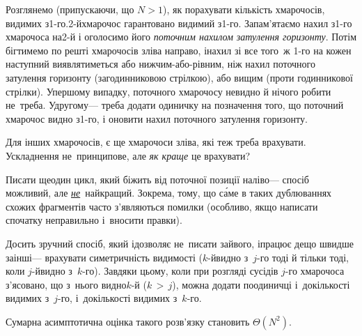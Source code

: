 Розглянемо (припускаючи, що $N{>}1$), як порахувати кількість хмарочосів, видимих з\nolinebreak[3] \mbox{1-го}.\linebreak[2] \mbox{2-й}\nolinebreak[3] хмарочос гарантовано видимий з\nolinebreak[3] \mbox{1-го}. Запам’ятаємо нахил з\nolinebreak[3] \mbox{1-го} хмарочоса на\nolinebreak[3] \mbox{2-й} і оголосимо його \emph{поточним нахилом затулення горизонту}. Потім бігтимемо по решті хмарочосів зліва направо, і\nolinebreak[3] нахил зі все того~ж \mbox{1-го} на кожен наступний виявлятиметься або нижчим-або-рівним, ніж нахил поточного затулення горизонту (за\nolinebreak[3] годинниковою стрілкою), або вищим (проти годинникової стрілки). У\nolinebreak[3] першому випадку, поточного хмарочосу не\nolinebreak[3] видно й нічого робити не~треба. У\nolinebreak[3] другому\nolinebreak[3] --- треба додати одиничку на позначення того, що поточний хмарочос видно з\nolinebreak[3] \mbox{1-го}, і оновити нахил поточного затулення горизонту.

Для інших хмарочосів, є ще хмарочоси зліва, які теж треба врахувати. Ускладнення не~принципове, але \emph{як краще} це врахувати?
\ifAfour\else\par\fi
Писати ще\nolinebreak[3] один цикл, який біжить від поточної позиції наліво\nolinebreak[3] --- спосіб можливий, але \underline{\emph{не}}~найкращий. Зокрема, тому, що с\'{а}ме в таких дублюваннях схожих фрагментів часто з'являються помилки (особливо, якщо написати спочатку неправильно і~вносити правки).

Досить зручний спосіб, який і\nolinebreak[3] дозволяє не~писати зайвого, і\nolinebreak[3] працює дещо швидше за\nolinebreak[2] інші\nolinebreak[3] --- врахувати симетричність видимості (\mbox{$k$-й}\nolinebreak[3] видно з~\mbox{$j$-го} тоді й тільки тоді, коли \mbox{$j$-й}\nolinebreak[3] видно з~\mbox{$k$-го}). Завдяки цьому, коли при розгляді сусідів \mbox{$j$-го} хмарочоса з'ясовано, що з~нього видно\nolinebreak[2] \mbox{$k$-й} (${k\,{>}\,j}$), можна додати по\nolinebreak[3] одиничці і~до\nolinebreak[2] кількості видимих з~\mbox{$j$-го}, і~до\nolinebreak[2] кількості видимих з~\mbox{$k$-го}.

Сумарна асимптотична оцінка такого розв'язку становить $\Theta(N^2)$.